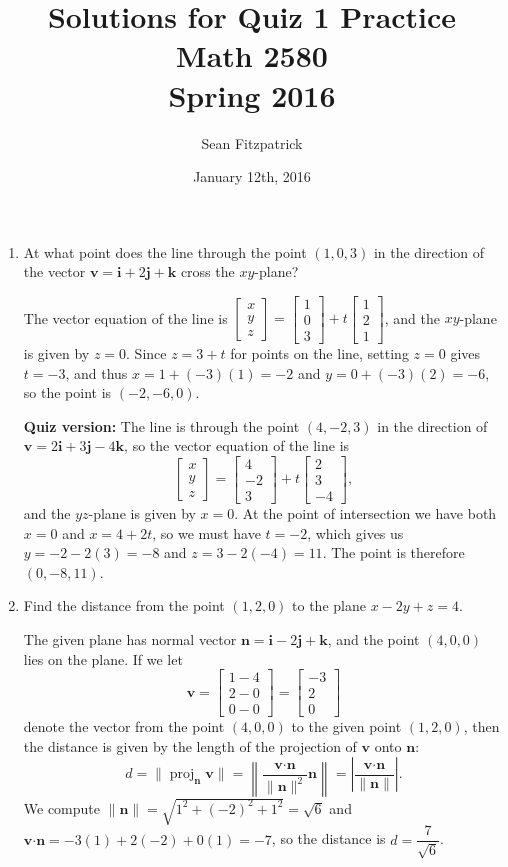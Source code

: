 \documentclass[letterpaper,12pt]{article}
\title{Solutions for Quiz 1 Practice\\Math 2580\\Spring 2016}
\author{Sean Fitzpatrick}
\date{January 12th, 2016}
\renewcommand{\i}{\mathbf{i}}
\renewcommand{\j}{\mathbf{j}}
\renewcommand{\k}{\mathbf{k}}
\newcommand{\bbm}{\begin{bmatrix}}
\newcommand{\ebm}{\end{bmatrix}}
\newcommand{\len}[1]{\lVert #1\rVert}
\newcommand{\dotp}{\boldsymbol{\cdot}}
\begin{document}
 \maketitle

\begin{enumerate}
 \item At what point does the line through the point $(1,0,3)$ in the direction of the vector $\mathbf{v} = \i+2\j+\k$ cross the $xy$-plane?

\bigskip

The vector equation of the line is $\bbm x\\y\\z\ebm = \bbm 1\\0\\3\ebm+t\bbm 1\\2\\1\ebm$, and the $xy$-plane is given by $z=0$. Since $z=3+t$ for points on the line, setting $z=0$ gives $t=-3$, and thus $x=1+(-3)(1) = -2$ and $y=0+(-3)(2) = -6$, so the point is $(-2,-6,0)$.

\medskip

{\bf Quiz version:} The line is through the point $(4,-2,3)$ in the direction of $\mathbf{v} = 2\i+3\j-4\k$, so the vector equation of the line is
\[
 \bbm x\\y\\z\ebm = \bbm 4\\-2\\3\ebm+t\bbm 2\\3\\-4\ebm,
\]
and the $yz$-plane is given by $x=0$. At the point of intersection we have both $x=0$ and $x=4+2t$, so we must have $t=-2$, which gives us $y=-2-2(3)=-8$ and $z=3-2(-4) = 11$. The point is therefore $(0,-8,11)$.

 \item Find the distance from the point $(1,2,0)$ to the plane $x-2y+z=4$.

\bigskip

The given plane has normal vector $\mathbf{n} = \i-2\j+\k$, and the point $(4,0,0)$ lies on the plane. If we let
\[
 \mathbf{v} = \bbm 1-4\\2-0\\0-0\ebm = \bbm -3\\2\\0\ebm
\]
denote the vector from the point $(4,0,0)$ to the given point $(1,2,0)$, then the distance is given by the length of the projection of $\mathbf{v}$ onto $\mathbf{n}$:
\[
 d = \len{\operatorname{proj}_{\mathbf{n}}\mathbf{v}} = \left\lVert\frac{\mathbf{v}\dotp \mathbf{n}}{\len{\mathbf{n}}^2}\mathbf{n}\right\rVert = \left\lvert \frac{\mathbf{v}\dotp \mathbf{n}}{\len{\mathbf{n}}} \right\rvert.
\]
We compute $\len{\mathbf{n}} = \sqrt{1^2+(-2)^2+1^2} = \sqrt{6}$ and $\mathbf{v}\dotp \mathbf{n} = -3(1)+2(-2)+0(1) = -7$, so the distance is $d = \dfrac{7}{\sqrt{6}}$.


\end{enumerate}
\end{document}
